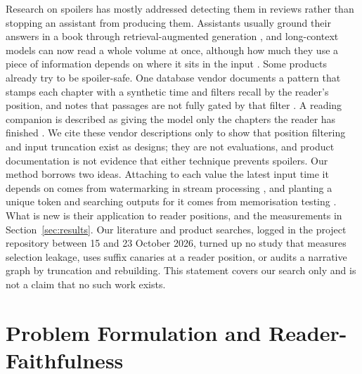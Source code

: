 \documentclass[sn-mathphys]{sn-jnl}%
\theoremstyle{thmstyleone}%
\theoremstyle{thmstyletwo}%
\theoremstyle{thmstylethree}%
\begin{document}
Research on spoilers has mostly addressed detecting them in reviews \cite{wan2019spoiler} rather than stopping an assistant from producing them. Assistants usually ground their answers in a book through retrieval-augmented generation \cite{lewis2020rag}, and long-context models can now read a whole volume at once, although how much they use a piece of information depends on where it sits in the input \cite{liu2024lost}. Some products already try to be spoiler-safe. One database vendor documents a pattern that stamps each chapter with a synthetic time and filters recall by the reader's position, and notes that passages are not fully gated by that filter \cite{surrealdb2026spoiler}. A reading companion is described as giving the model only the chapters the reader has finished \cite{aiindigo2026paige}. We cite these vendor descriptions only to show that position filtering and input truncation exist as designs; they are not evaluations, and product documentation is not evidence that either technique prevents spoilers. Our method borrows two ideas. Attaching to each value the latest input time it depends on comes from watermarking in stream processing \cite{akidau2015dataflow}, and planting a unique token and searching outputs for it comes from memorisation testing \cite{carlini2019secret}. What is new is their application to reader positions, and the measurements in Section~\ref{sec:results}. Our literature and product searches, logged in the project repository between 15 and 23 October 2026, turned up no study that measures selection leakage, uses suffix canaries at a reader position, or audits a narrative graph by truncation and rebuilding. This statement covers our search only and is not a claim that no such work exists.

\section{Problem Formulation and Reader-Faithfulness}\label{sec:problem}
\end{document}
